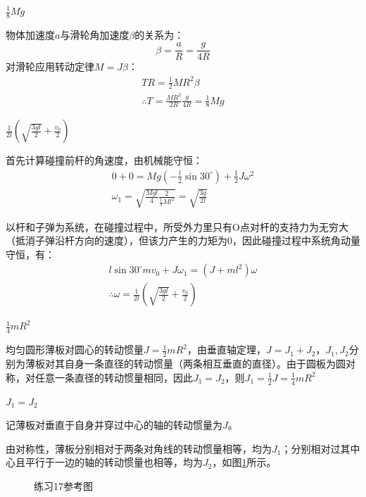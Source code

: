 \documentclass[b5paper,opensource,sourcefont,parskip]{qyxf-book}
\begin{document}
$\frac{1}{8}Mg$

\solve 物体加速度$ a $与滑轮角加速度$ \beta $的关系为：
\[\beta=\frac{a}{R}=\frac{g}{4R}\]
对滑轮应用转动定律$M=J\beta$：
\begin{gather*}
TR=\frac{1}{2}MR^2\beta\\
\therefore T=\frac{MR^2}{2R}\frac{g}{4R}=\frac{1}{8}Mg
\end{gather*}

$\frac{1}{2l}\left(\sqrt{\frac{3gl}{2}}+\frac{v_0}{2}\right)$

\solve 首先计算碰撞前杆的角速度，由机械能守恒：
\begin{gather*}
0+0=Mg(-\frac{l}{2}\sin 30^\circ)+\frac{1}{2}J\omega^2\\
\omega_1=\sqrt{\frac{Mgl}{4}\frac{2}{\frac{1}{3}Ml^2}}=\sqrt{\frac{3g}{2l}}
\end{gather*}

以杆和子弹为系统，在碰撞过程中，所受外力里只有O点对杆的支持力为无穷大（抵消子弹沿杆方向的速度），但该力产生的力矩为0，因此碰撞过程中系统角动量守恒，有：
\begin{gather*}
l\sin 30^\circ mv_0+J\omega_1=(J+ml^2)\omega\\
\therefore \omega=\frac{1}{2l}\left(\sqrt{\frac{3gl}{2}}+\frac{v_0}{2}\right)
\end{gather*}

$\frac{1}{4}mR^2$

\solve 均匀圆形薄板对圆心的转动惯量$ J=\frac{1}{2}mR^2 $，由垂直轴定理，$ J=J_1+J_2 $，$ J_1,J_2 $分别为薄板对其自身一条直径的转动惯量（两条相互垂直的直径）。由于圆板为圆对称，对任意一条直径的转动惯量相同，因此$ J_1=J_2 $，则$ J_1=\frac{1}{2}J=\frac{1}{4}mR^2 $

$J_1=J_2$

\solve 记薄板对垂直于自身并穿过中心的轴的转动惯量为$ J $。

由对称性，薄板分别相对于两条对角线的转动惯量相等，均为$J_1$；分别相对过其中心且平行于一边的轴的转动惯量也相等，均为$J_2$，如图\ref{fig:c4-t17}所示。

\begin{figure}[htbp]
\centering
{}
\caption{练习17参考图}\label{fig:c4-t17}
\end{figure}
\end{document}
